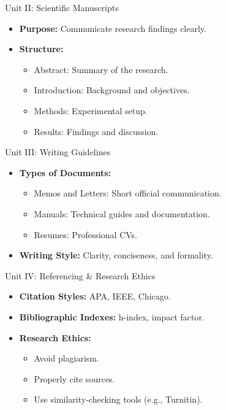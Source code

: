 \documentclass{beamer}
\begin{document}
\begin{frame}{Unit II: Scientific Manuscripts}
    \begin{itemize}
        \item \textbf{Purpose:} Communicate research findings clearly.
        \item \textbf{Structure:}
            \begin{itemize}
                \item Abstract: Summary of the research.
                \item Introduction: Background and objectives.
                \item Methods: Experimental setup.
                \item Results: Findings and discussion.
            \end{itemize}
    \end{itemize}
\end{frame}

\begin{frame}{Unit III: Writing Guidelines}
    \begin{itemize}
        \item \textbf{Types of Documents:}
            \begin{itemize}
                \item Memos and Letters: Short official communication.
                \item Manuals: Technical guides and documentation.
                \item Resumes: Professional CVs.
            \end{itemize}
        \item \textbf{Writing Style:} Clarity, conciseness, and formality.
    \end{itemize}
\end{frame}

\begin{frame}{Unit IV: Referencing & Research Ethics}
    \begin{itemize}
        \item \textbf{Citation Styles:} APA, IEEE, Chicago.
        \item \textbf{Bibliographic Indexes:} h-index, impact factor.
        \item \textbf{Research Ethics:}
            \begin{itemize}
                \item Avoid plagiarism.
                \item Properly cite sources.
                \item Use similarity-checking tools (e.g., Turnitin).
            \end{itemize}
    \end{itemize}
\end{frame}
\end{document}
